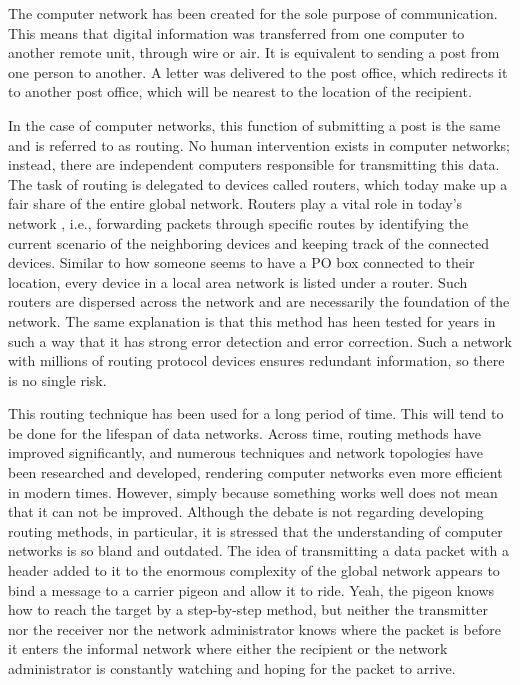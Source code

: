    The computer network has been created for the sole purpose of communication. This means that digital information was transferred from one computer to another remote unit, through wire or air. It is equivalent to sending a post from one person to another. A letter was delivered to the post office, which redirects it to another post office, which will be nearest to the location of the recipient. 
    
    In the case of computer networks, this function of submitting a post is the same and is referred to as routing. No human intervention exists in computer networks; instead, there are independent computers responsible for transmitting this data. The task of routing is delegated to devices called routers, which today make up a fair share of the entire global network. 
    Routers play a vital role in today's network , i.e., forwarding packets through specific routes by identifying the current scenario of the neighboring devices and keeping track of the connected devices.  Similar to how someone seems to have a PO box connected to their location, every device in a local area network is listed under a router.  Such routers are dispersed across the network and are necessarily the foundation of the network.  The same explanation is that this method has heen tested for years in such a way that it has strong error detection and error correction. Such a network with millions of routing protocol devices ensures redundant information, so there is no single risk. 
    \vspace{2mm}
    
    This routing technique has been used for a long period of time. This will tend to be done for the lifespan of data networks. Across time, routing methods have improved significantly, and numerous techniques and network topologies \cite{topograph1996} have been researched and developed, rendering computer networks even more efficient in modern times. However, simply because something works well does not mean that it can not be improved. Although the debate is not regarding developing routing methods, in particular, it is stressed that the understanding of computer networks is so bland and outdated. The idea of transmitting a data packet with a header added to it to the enormous complexity of the global network appears to bind a message to a carrier pigeon and allow it to ride. Yeah, the pigeon knows how to reach the target by a step-by-step method, but neither the transmitter nor the receiver nor the network administrator knows where the packet is before it enters the informal network where either the recipient or the network administrator is constantly watching and hoping for the packet to arrive.
    
